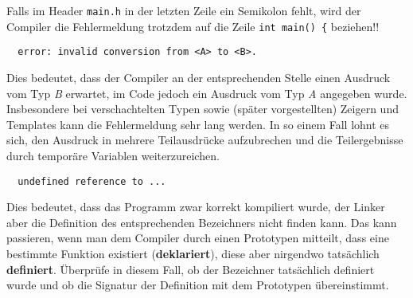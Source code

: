 Falls im Header \texttt{main.h} in der letzten Zeile ein Semikolon fehlt, wird der Compiler die Fehlermeldung trotzdem auf die Zeile \texttt{int main() \{} beziehen!!

\begin{verbatim}
  error: invalid conversion from <A> to <B>.
\end{verbatim}

Dies bedeutet, dass der Compiler an der entsprechenden Stelle einen Ausdruck vom Typ \emph{B} erwartet, im Code jedoch ein Ausdruck vom Typ \emph{A} angegeben wurde. Insbesondere bei verschachtelten Typen sowie (später vorgestellten) Zeigern und Templates kann die Fehlermeldung sehr lang werden. In so einem Fall lohnt es sich, den Ausdruck in mehrere Teilausdrücke aufzubrechen und die Teilergebnisse durch temporäre Variablen weiterzureichen.

\begin{verbatim}
  undefined reference to ...
\end{verbatim}

Dies bedeutet, dass das Programm zwar korrekt kompiliert wurde, der Linker aber die Definition des entsprechenden Bezeichners nicht finden kann.
Das kann passieren, wenn man dem Compiler durch einen Prototypen mitteilt, dass eine bestimmte Funktion existiert (\textbf{deklariert}), diese aber nirgendwo tatsächlich \textbf{definiert}.
Überprüfe in diesem Fall, ob der Bezeichner tatsächlich definiert wurde und ob die Signatur der Definition mit dem Prototypen übereinstimmt.


\setlength{\leftskip}{0pt}
